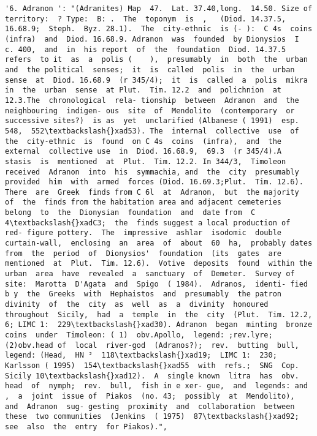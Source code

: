 \documentclass[11pt]{article}
\begin{document}
\begin{Verbatim}[commandchars=\\\{\}]
         '6. Adranon ': "(Adranites) Map  47.  Lat. 37.40,long.  14.50. Size of  territory:  ? Type:  B: .  The  toponym  is  ,   (Diod. 14.37.5,  16.68.9;  Steph.  Byz. 28.1).  The  city-ethnic  is (- ):  C 4s  coins  (infra)  and  Diod. 16.68.9. Adranon  was  founded  by Dionysios  I  c. 400,  and  in  his report  of  the  foundation  Diod. 14.37.5  refers  to it  as  a  polis (    ),  presumably  in  both  the  urban  and  the political  senses;  it  is  called  polis  in  the  urban  sense  at  Diod. 16.68.9  (r 345/4);  it  is  called  a  polis  mikra  in  the  urban  sense  at Plut.  Tim. 12.2  and  polichnion  at 12.3.The  chronological  rela- tionship  between  Adranon  and  the  neighbouring  indigen- ous  site  of  Mendolito  (contemporary  or  successive sites?)  is as  yet  unclarified (Albanese ( 1991)  esp. 548,  552\textbackslash{}xad53). The  internal  collective  use  of  the  city-ethnic  is  found  on C 4s  coins  (infra),  and  the  external  collective use  in  Diod. 16.68.9,  69.3  (r 345/4).A  stasis  is  mentioned  at  Plut.  Tim. 12.2. In 344/3,  Timoleon  received  Adranon  into  his  symmachia, and  the  city  presumably  provided  him  with  armed  forces (Diod. 16.69.3;Plut.  Tim. 12.6). There  are  Greek  finds from C 6l  at  Adranon,  but  the majority  of  the  finds from the habitation area and adjacent cemeteries  belong  to  the  Dionysian  foundation  and  date from  C 4\textbackslash{}xadC3;  the  finds suggest a local production of  red- figure pottery.  The  impressive  ashlar  isodomic  double  curtain-wall,  enclosing  an  area  of  about  60  ha,  probably dates  from  the  period  of  Dionysios'  foundation  (its  gates  are mentioned  at  Plut.  Tim. 12.6).  Votive  deposits  found  within the  urban  area  have  revealed  a  sanctuary  of  Demeter.  Survey of  site:  Marotta  D'Agata  and  Spigo  ( 1984).  Adranos,  identi- fied b y  the  Greeks  with  Hephaistos  and  presumably  the patron  divinity  of  the  city  as  well  as  a  divinity  honoured throughout  Sicily,  had  a  temple  in  the  city  (Plut.  Tim. 12.2,  6; LIMC 1:  229\textbackslash{}xad30). Adranon  began  minting  bronze  coins  under  Timoleon: ( 1)  obv.Apollo,  legend: ;rev.lyre;(2)obv.head of  local  river-god  (Adranos?);  rev.  butting  bull,  legend: (Head,  HN ²  118\textbackslash{}xad19;  LIMC 1:  230;  Karlsson ( 1995)  154\textbackslash{}xad55  with  refs.;  SNG  Cop.  Sicily 10\textbackslash{}xad12).  A  single known  litra  has  obv.  head  of  nymph;  rev.  bull,  fish in e xer- gue,  and  legends: and ,  a  joint  issue of  Piakos  (no. 43;  possibly  at  Mendolito),  and  Adranon  sug- gesting  proximity  and  collaboration  between  these  two communities  (Jenkins  ( 1975)  87\textbackslash{}xad92;  see  also  the  entry  for Piakos).",

\end{Verbatim}
\end{document}
